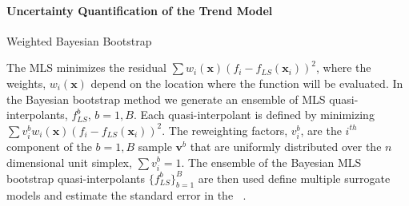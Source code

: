 \documentclass[11pt]{NSFamsart}
\DeclareMathOperator{\QOI}{QOI} %
\DeclareMathOperator{\APP}{\widehat{\QOI}}
\newcommand{\bx}{{\boldsymbol{x}}}
\newcommand{\bv}{{\boldsymbol{v}}}
\begin{document}
\paragraph*{Uncertainty Quantification of the Trend Model} 
Weighted Bayesian Bootstrap

The MLS minimizes the residual $\sum w_i(\bx)(f_i - f_{LS}(\bx_i))^2$, where the weights, $w_i(\bx)$ depend on the location where the function will be evaluated. In the Bayesian bootstrap method \cite{rubin1981bayesian, efron1986bootstrap, efron2016computer} we generate an ensemble of MLS quasi-interpolants, $f_{LS}^b$, $b=1,B$. Each quasi-interpolant is defined by minimizing $\sum v_i^b w_i(\bx)(f_i - f_{LS}(\bx_i))^2$.   The reweighting factors, $v_i^b$, are the $i^{th}$ component of the $b=1,B$ sample $\bv^b$ that are uniformly distributed over the $n$ dimensional unit simplex, $\sum v_i^b = 1 $.  The ensemble of the Bayesian MLS bootstrap quasi-interpolants $\{f_{LS}^b \}_{b=1}^B$ are then used define multiple surrogate models and estimate the standard error in the $\APP$. 

\end{document}
